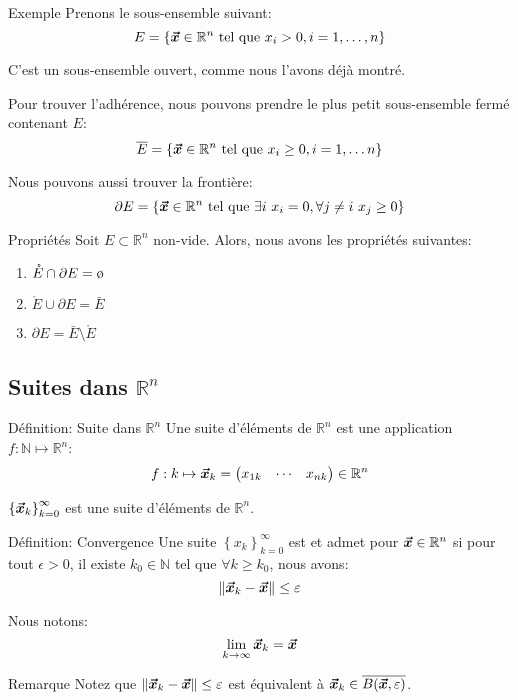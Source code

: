 \documentclass[a4paper]{article}
\begin{document}
\begin{parag}{Exemple}
    Prenons le sous-ensemble suivant: 
    \[E = \left\{\bvec{x} \in \mathbb{R}^n \telque x_i > 0, i = 1, \ldots, n\right\}\]
    
    C'est un sous-ensemble ouvert, comme nous l'avons déjà montré.

    Pour trouver l'adhérence, nous pouvons prendre le plus petit sous-ensemble fermé contenant $E$: 
    \[\bar{E} = \left\{\bvec{x} \in \mathbb{R}^n \telque x_i \geq 0, i = 1, \ldots n\right\}\]
    
    Nous pouvons aussi trouver la frontière: 
    \[\partial E = \left\{\bvec{x} \in \mathbb{R}^n \telque \exists i\ x_i = 0, \forall j \neq i\ x_j \geq 0\right\}\]
\end{parag}

\begin{parag}{Propriétés}
    Soit $E \subset \mathbb{R}^n$ non-vide. Alors, nous avons les propriétés suivantes:
    \begin{enumerate}
        \item $\mathring{E} \cap \partial E = \o$
        \item $\mathring{E} \cup \partial E = \bar{E}$
        \item $\partial E = \bar{E} \setminus \mathring{E}$
    \end{enumerate}
\end{parag}

\subsection{Suites dans $\mathbb{R}^n$}
\begin{parag}{Définition: Suite dans $\mathbb{R}^n$}
    Une suite d'éléments de $\mathbb{R}^n$ est une application $f: \mathbb{N} \mapsto \mathbb{R}^n$: 
    \[f: k \mapsto \bm{\protect\vec{x}}_k = \begin{pmatrix} x_{1k} & \cdots & x_{nk} \end{pmatrix} \in \mathbb{R}^n\]
    
    $\left\{\bvec{x}_k\right\}_{k=0}^{\infty}$ est une suite d'éléments de $\mathbb{R}^n$.
\end{parag}

\begin{parag}{Définition: Convergence}
    Une suite $\left\{x_k\right\}_{k=0}^{\infty}$ est  et admet pour  $\bm{\protect\vec{x}} \in \mathbb{R}^n$ si pour tout $\epsilon > 0$, il existe $k_0 \in \mathbb{N}$ tel que $\forall k \geq k_0$, nous avons: 
    \[\left\|\bvec{x}_k - \bvec{x}\right\| \leq \epsilon\]
    
    Nous notons: 
    \[\lim_{k \to \infty} \bm{\protect\vec{x}}_k = \bm{\protect\vec{x}}\]

    \begin{subparag}{Remarque}
        Notez que $\left\|\bvec{x}_k - \bvec{x}\right\| \leq \epsilon$ est équivalent à $\bvec{x}_k \in \bar{B\left(\bvec{x}, \epsilon\right)}$.
    \end{subparag}
\end{parag}
\end{document}
